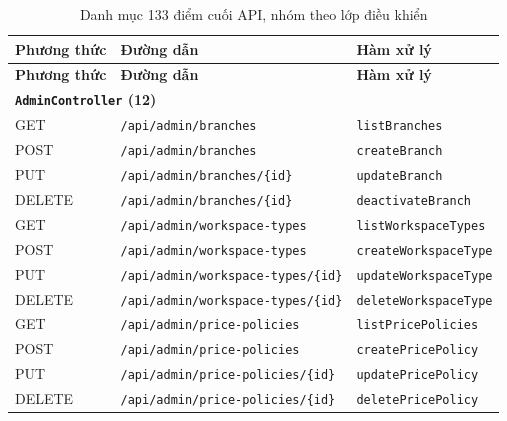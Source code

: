 {\footnotesize
\begin{longtable}{|p{1.5cm}|p{7.3cm}|p{5.0cm}|}
\caption{Danh mục 133 điểm cuối API, nhóm theo lớp điều khiển}\label{tab:pl_api}\\
\hline
\textbf{Phương thức} & \textbf{Đường dẫn} & \textbf{Hàm xử lý} \\
\hline
\endfirsthead
\hline
\textbf{Phương thức} & \textbf{Đường dẫn} & \textbf{Hàm xử lý} \\
\hline
\endhead
\multicolumn{3}{|l|}{\textbf{\texttt{AdminController} (12)}} \\
\hline
GET & \texttt{/\allowbreak api/\allowbreak admin/\allowbreak branches} & \texttt{listBranches} \\
\hline
POST & \texttt{/\allowbreak api/\allowbreak admin/\allowbreak branches} & \texttt{createBranch} \\
\hline
PUT & \texttt{/\allowbreak api/\allowbreak admin/\allowbreak branches/\allowbreak \{id\}} & \texttt{updateBranch} \\
\hline
DELETE & \texttt{/\allowbreak api/\allowbreak admin/\allowbreak branches/\allowbreak \{id\}} & \texttt{deactivateBranch} \\
\hline
GET & \texttt{/\allowbreak api/\allowbreak admin/\allowbreak workspace-types} & \texttt{listWorkspaceTypes} \\
\hline
POST & \texttt{/\allowbreak api/\allowbreak admin/\allowbreak workspace-types} & \texttt{createWorkspaceType} \\
\hline
PUT & \texttt{/\allowbreak api/\allowbreak admin/\allowbreak workspace-types/\allowbreak \{id\}} & \texttt{updateWorkspaceType} \\
\hline
DELETE & \texttt{/\allowbreak api/\allowbreak admin/\allowbreak workspace-types/\allowbreak \{id\}} & \texttt{deleteWorkspaceType} \\
\hline
GET & \texttt{/\allowbreak api/\allowbreak admin/\allowbreak price-policies} & \texttt{listPricePolicies} \\
\hline
POST & \texttt{/\allowbreak api/\allowbreak admin/\allowbreak price-policies} & \texttt{createPricePolicy} \\
\hline
PUT & \texttt{/\allowbreak api/\allowbreak admin/\allowbreak price-policies/\allowbreak \{id\}} & \texttt{updatePricePolicy} \\
\hline
DELETE & \texttt{/\allowbreak api/\allowbreak admin/\allowbreak price-policies/\allowbreak \{id\}} & \texttt{deletePricePolicy} \\

\end{longtable}}
